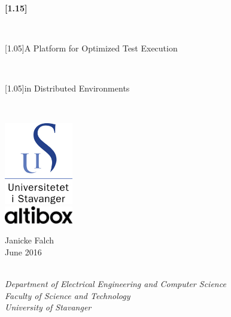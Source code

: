 \thispagestyle{empty}
\vspace*{1cm}
\begin{center}
    \scshape{
        \begin{Huge}\textbf{\scalebox{1}[1.15]{\toolname}}\end{Huge}\\
        \vspace{0.6cm}
        \begin{Large}\scalebox{1}[1.05]{A Platform for Optimized Test Execution}\end{Large}\\
        \vspace{0.2cm}
        \begin{Large}\scalebox{1}[1.05]{in Distributed Environments}\end{Large}\\
    }
    \vspace{2.4cm}
    \includegraphics[width=3cm]{figures/uis_logo}\\
    \vspace{0.8cm}
    \includegraphics[width=3cm]{figures/logo_pos_RGB}\\
    \vspace{1.6cm}
    \begin{large}Janicke Falch\\
    \vspace{0.2cm}
    June 2016\end{large}\\
    \vspace{1cm}
    \emph{
        Department of Electrical Engineering and Computer Science\\
        Faculty of Science and Technology\\
        University of Stavanger
    }
\end{center}